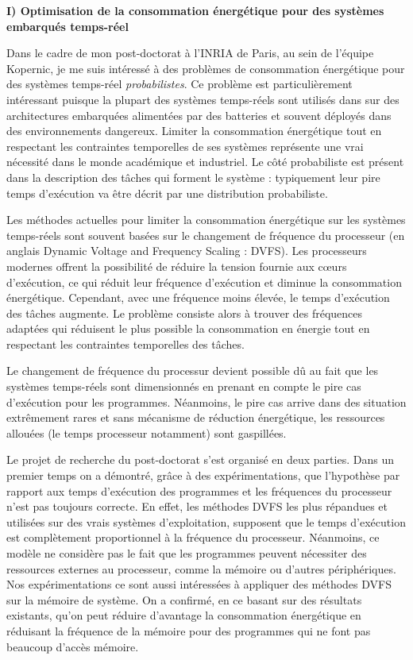 \documentclass{article}
\begin{document}
\textbf{I) Optimisation de la consommation énergétique pour des systèmes embarqués temps-réel}
\vspace{.5cm}

Dans le cadre de mon post-doctorat à l'INRIA de Paris, au sein de l'équipe Kopernic, je me suis intéressé à 
des problèmes de consommation énergétique pour des systèmes temps-réel \textit{probabilistes}. Ce 
problème est particulièrement intéressant puisque la plupart des systèmes temps-réels sont utilisés dans 
sur des architectures embarquées alimentées par des batteries et souvent déployés dans des 
environnements dangereux. Limiter la consommation énergétique tout en respectant les contraintes 
temporelles de ses systèmes représente une vrai nécessité dans le monde académique et industriel. Le côté 
probabiliste est présent dans la description des tâches qui forment le système : typiquement leur pire temps 
d'exécution va être décrit par une distribution probabiliste.

Les méthodes actuelles pour limiter la consommation énergétique sur les systèmes temps-réels sont 
souvent basées sur le changement de fréquence du processeur (en anglais Dynamic Voltage and Frequency 
Scaling : DVFS). Les processeurs modernes offrent la 
possibilité de réduire la tension fournie aux c\oe{}urs d'exécution, ce qui réduit leur fréquence d'exécution et 
diminue la consommation énergétique. Cependant, avec une fréquence moins élevée, le temps d'exécution  
des tâches augmente. Le problème consiste alors à trouver des fréquences adaptées qui réduisent le 
plus possible  la consommation en énergie tout en respectant les contraintes temporelles des tâches.


Le changement de fréquence du processur devient possible dû au fait que les systèmes temps-réels sont 
dimensionnés en prenant en compte le pire cas d'exécution pour les programmes. Néanmoins, le pire cas 
arrive dans des situation extrêmement rares et sans mécanisme de réduction énergétique, les ressources 
allouées (le temps processeur notamment) sont gaspillées.
\vspace{.5cm}


Le projet de recherche du post-doctorat s'est organisé en deux parties. Dans un premier temps on a 
démontré, grâce à des expérimentations, que l'hypothèse par rapport aux temps d'exécution des 
programmes et les fréquences du processeur n'est pas toujours correcte. En effet, les méthodes DVFS les 
plus répandues et utilisées sur des vrais systèmes d'exploitation, supposent que le temps d'exécution est 
complètement proportionnel à la fréquence du processeur. Néanmoins, ce modèle ne considère pas le fait 
que les programmes peuvent nécessiter des ressources externes au processeur, comme la mémoire ou 
d'autres périphériques. Nos expérimentations ce sont aussi intéressées à appliquer des méthodes DVFS sur 
la mémoire de système. On a confirmé, en ce basant sur des résultats existants, qu'on peut réduire 
d'avantage la consommation énergétique en réduisant la fréquence de la mémoire pour des programmes 
qui ne font pas beaucoup d'accès mémoire.
\end{document}
